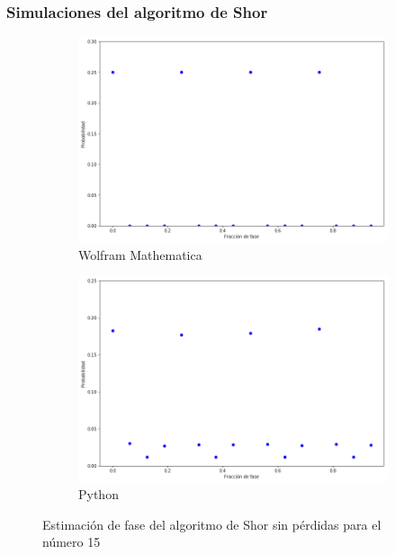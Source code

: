\documentclass[xetex,mathserif,serif, 8pt]{beamer}
\begin{document}
\begin{frame}
    \frametitle{Simulaciones del algoritmo de Shor}

\begin{figure}[H]
    \centering
    \begin{subfigure}[m]{0.47\textwidth}
        \centering
        \includegraphics[width=0.95\linewidth]{img/ShorM15.png}
        \caption{Wolfram Mathematica}
    \end{subfigure}
    \begin{subfigure}[m]{0.47\textwidth}
        \centering
        \includegraphics[width=0.95\linewidth]{img/shorlossless.png}
        \caption{Python}
    \end{subfigure}
    \caption{Estimación de fase del algoritmo de Shor sin pérdidas para el número 15}
    \label{fig:shor15}
\end{figure}

\end{frame}
\end{document}

